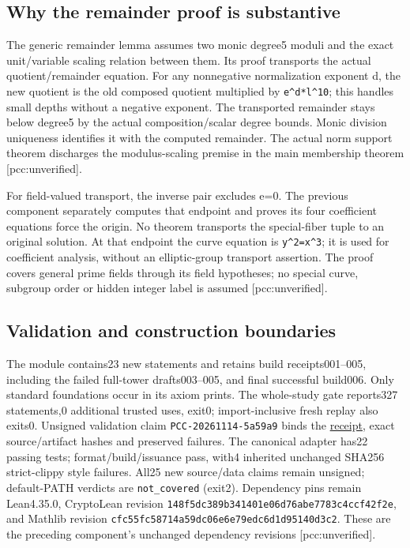\documentclass[
  10pt,
]{article}
\begin{document}
\subsection{Why the remainder proof is
substantive}\label{why-the-remainder-proof-is-substantive}

The generic remainder lemma assumes two monic degree5 moduli and the
exact unit/variable scaling relation between them. Its proof transports
the actual quotient/remainder equation. For any nonnegative
normalization exponent d, the new quotient is the old composed quotient
multiplied by \texttt{e\^{}d*l\^{}10}; this handles small depths without
a negative exponent. The transported remainder stays below degree5 by
the actual composition/scalar degree bounds. Monic division uniqueness
identifies it with the computed remainder. The actual norm support
theorem discharges the modulus-scaling premise in the main membership
theorem {[}pcc:unverified{]}.

For field-valued transport, the inverse pair excludes e=0. The previous
component separately computes that endpoint and proves its four
coefficient equations force the origin. No theorem transports the
special-fiber tuple to an original solution. At that endpoint the curve
equation is \texttt{y\^{}2=x\^{}3}; it is used for coefficient analysis,
without an elliptic-group transport assertion. The proof covers general
prime fields through its field hypotheses; no special curve, subgroup
order or hidden integer label is assumed {[}pcc:unverified{]}.

\subsection{Validation and construction
boundaries}\label{validation-and-construction-boundaries}

The module contains23 new statements and retains build receipts001--005,
including the failed full-tower drafts003--005, and final successful
build006. Only standard foundations occur in its axiom prints. The
whole-study gate reports327 statements,0 additional trusted uses, exit0;
import-inclusive fresh replay also exits0. Unsigned validation claim
\texttt{PCC-20261114-5a59a9} binds the
\href{../pole-transport-evidence/validation-001.json}{receipt}, exact
source/artifact hashes and preserved failures. The canonical adapter
has22 passing tests; format/build/issuance pass, with4 inherited
unchanged SHA256 strict-clippy style failures. All25 new source/data
claims remain unsigned; default-PATH verdicts are \texttt{not\_covered}
(exit2). Dependency pins remain Lean4.35.0, CryptoLean revision
\texttt{148f5dc389b341401e06d76abe7783c4ccf42f2e}, and Mathlib revision
\texttt{cfc55fc58714a59dc06e6e79edc6d1d95140d3c2}. These are the
preceding component's unchanged dependency revisions
{[}pcc:unverified{]}.
\end{document}
